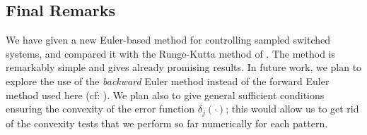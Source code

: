 % 



\subsection{Final Remarks}\label{sec:fr}
We have given a new Euler-based method for controlling sampled switched systems,
and compared it with the Runge-Kutta method of \cite{NL_minimator}. 
The method is remarkably simple and gives already promising results. 
In future work, we plan to explore
the use of the {\em backward} Euler method instead of the forward Euler method used here
(cf: \cite{Beyn2010}).
We plan also to give general sufficient conditions ensuring the convexity
of the error function $\delta_j(\cdot)$; this would allow us to get rid of
the convexity tests that we perform so far numerically for each pattern.






